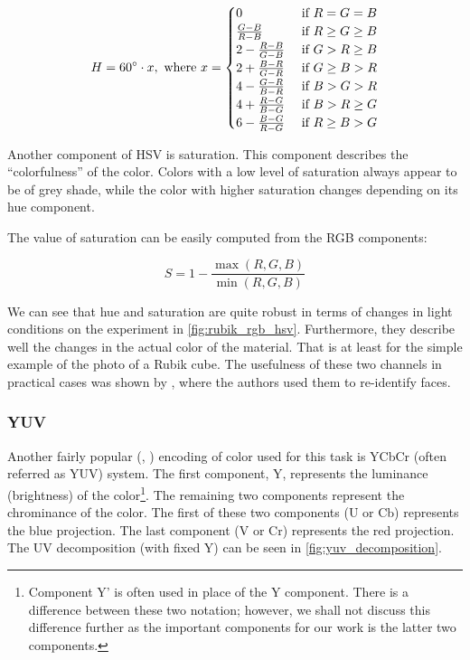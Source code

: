 $$H = 60\degree \cdot x, \text{ where } x = 
\begin{cases}
0 & \text{ if } R = G = B \\
\frac{G - B}{R - B} & \text{ if } R \geq G \geq B \\
2 - \frac{R - B}{G - B} & \text{ if } G > R \geq B \\
2 + \frac{B - R}{G - R} & \text{ if } G \geq B > R \\
4 - \frac{G - R}{B - R} & \text{ if } B > G > R \\
4 + \frac{R - G}{B - G} & \text{ if } B > R \geq G \\
6 - \frac{B - G}{R - G} & \text{ if } R \geq B > G
\end{cases}$$

Another component of HSV is saturation. This component describes the ``colorfulness'' of the color. Colors with a low level of saturation always appear to be of grey shade, while the color with higher saturation changes depending on its hue component.

The value of saturation can be easily computed from the RGB components:

$$S = 1 - \frac{\max(R,G,B)}{\min(R,G,B)}$$

We can see that hue and saturation are quite robust in terms of changes in light conditions on the experiment in \autoref{fig:rubik_rgb_hsv}. Furthermore, they describe well the changes in the actual color of the material. That is at least for the simple example of the photo of a Rubik cube. The usefulness of these two channels in practical cases was shown by \cite{mckenna1997tracking}, where the authors used them to re-identify faces.

\subsubsection{YUV}

Another fairly popular (\cite{orwell1999multi}, \cite{wren1997pfinder}) encoding of color used for this task is YCbCr (often referred as YUV) system. The first component, Y, represents the luminance (brightness) of the color\footnote{Component Y' is often used in place of the Y component. There is a difference between these two notation; however, we shall not discuss this difference further as the important components for our work is the latter two components.}. The remaining two components represent the chrominance of the color. The first of these two components (U or Cb) represents the blue projection. The last component (V or Cr) represents the red projection. The UV decomposition (with fixed Y) can be seen in \autoref{fig:yuv_decomposition}.

